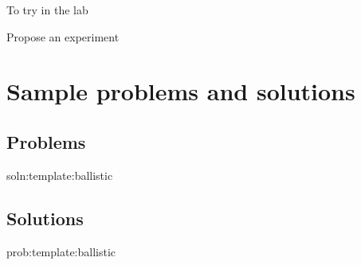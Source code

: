 \begin{chapteractivity}{To try in the lab}
{
\item Propose an experiment
}
\end{chapteractivity}

\newpage
\section{Sample problems and solutions}
\subsection{Problems}
\begin{problem}{soln:template:ballistic}{\label{prob:template:ballistic} 

}
\end{problem}
\newpage
\subsection{Solutions}
\begin{solution}{prob:template:ballistic}\label{soln:template:ballistic}

\end{solution}

